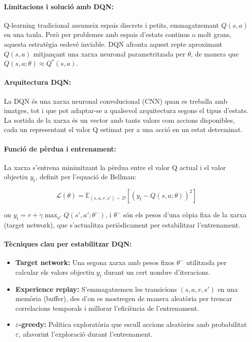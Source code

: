 \documentclass[12pt,a4paper,twoside]{book}
\begin{document}
\paragraph{Limitacions i solució amb DQN:}

Q-learning tradicional assumeix espais discrets i petits, emmagatzemant $Q(s,a)$ en una taula. Però per problemes amb espais d'estats continus o molt grans, aquesta estratègia esdevé inviable. DQN afronta aquest repte aproximant $Q(s,a)$ mitjançant una xarxa neuronal parametritzada per $\theta$, de manera que $Q(s,a; \theta) \approx Q^*(s,a)$.

\paragraph{Arquitectura DQN:}

La DQN és una xarxa neuronal convolucional (CNN) quan es treballa amb imatges, tot i que pot adaptar-se a qualsevol arquitectura segons el tipus d'estats. La sortida de la xarxa és un vector amb tants valors com accions disponibles, cada un representant el valor Q estimat per a una acció en un estat determinat.

\paragraph{Funció de pèrdua i entrenament:}

La xarxa s'entrena minimitzant la pèrdua entre el valor Q actual i el valor objectiu $y_t$, definit per l'equació de Bellman:

\begin{equation}
\mathcal{L}(\theta) = \mathbb{E}_{(s,a,r,s') \sim \mathcal{D}} \left[ \left( y_t - Q(s, a; \theta) \right)^2 \right]
\end{equation}

on $y_t = r + \gamma \max_{a'} Q(s', a'; \theta^-)$, i $\theta^-$ són els pesos d'una còpia fixa de la xarxa (target network), que s'actualitza periòdicament per estabilitzar l'entrenament.

\paragraph{Tècniques clau per estabilitzar DQN:}

\begin{itemize}
  \item \textbf{Target network:} Una segona xarxa amb pesos fixos $\theta^-$ utilitzada per calcular els valors objectiu $y_t$ durant un cert nombre d'iteracions.
  \item \textbf{Experience replay:} S'emmagatzemen les transicions $(s,a,r,s')$ en una memòria (buffer), des d'on es mostregen de manera aleatòria per trencar correlacions temporals i millorar l'eficiència de l'entrenament.
  \item \textbf{$\varepsilon$-greedy:} Política exploratòria que escull accions aleatòries amb probabilitat $\varepsilon$, afavorint l'exploració durant l'entrenament.
\end{itemize}
\end{document}

